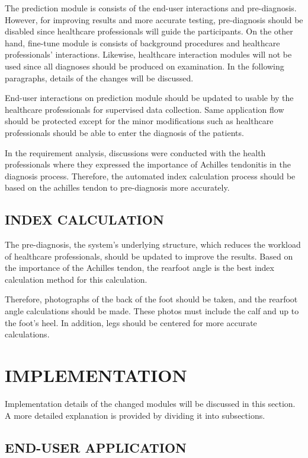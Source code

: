 The prediction module is consists of the end-user interactions and pre-diagnosis. However, for improving results and more accurate testing, pre-diagnosis should be disabled since healthcare professionals will guide the participants. On the other hand, fine-tune module is consists of background procedures and healthcare professionals' interactions. Likewise, healthcare interaction modules will not be used since all diagnoses should be produced on examination. In the following paragraphs, details of the changes will be discussed.

End-user interactions on prediction module should be updated to usable by the healthcare professionals for supervised data collection. Same application flow should be protected except for the minor modifications such as healthcare professionals should be able to enter the diagnosis of the patients.

In the requirement analysis, discussions were conducted with the health professionals where they expressed the importance of Achilles tendonitis in the diagnosis process. Therefore, the automated index calculation process should be based on the achilles tendon to pre-diagnosis more accurately.

\subsection{ INDEX CALCULATION }

The pre-diagnosis, the system's underlying structure, which reduces the workload of healthcare professionals, should be updated to improve the results. Based on the importance of the Achilles tendon, the rearfoot angle is the best index calculation method for this calculation. 

Therefore, photographs of the back of the foot should be taken, and the rearfoot angle calculations should be made. These photos must include the calf and up to the foot's heel. In addition, legs should be centered for more accurate calculations.

\section{IMPLEMENTATION}\label{sec:StudyIIImplementation}

Implementation details of the changed modules will be discussed in this section. A more detailed explanation is provided by dividing it into subsections. 

\subsection{END-USER APPLICATION}

